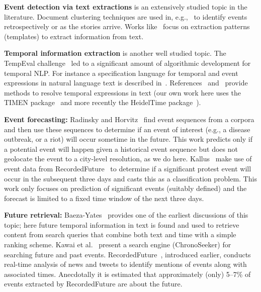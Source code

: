 \documentclass[letterpaper]{article}
\begin{document}
{\bf Event detection via text extractions}
is an extensively studied topic in the literature. Document clustering techniques are used 
in, e.g.,~\cite{Gabrilovich:2004:NPP} to identify events retrospectively or as the stories arrive.
Works like~\cite{Banko07openinformation,Chambers:2011:TIE,riloff2003learning} focus on
extraction patterns (templates) to extract information from text. 

{\bf Temporal information extraction} is another well studied topic.
The TempEval challenge~\cite{tempeval} led to a significant amount of
algorithmic development for temporal NLP.
For instance a specification language
for temporal and event expressions in natural language text is described in~\cite{timeml}.
References~\cite{LlorensDGS12} and~\cite{tempex} provide methods to
resolve temporal expressions in text (our own work here uses the TIMEN
package~\cite{LlorensDGS12} and more recently the HeidelTime
package~\cite{strotgen2014time}).

{\bf Event forecasting:} 
Radinsky and Horvitz~ find event sequences
from a corpora and then use these sequences to determine if an event of
interest (e.g., a disease outbreak, or a riot) will occur sometime in
the future. This work predicts only if a potential event will happen
given a historical event sequence but does not geolocate the event to a
city-level resolution, as we do here.  Kallus~
make use of event data from RecordedFuture~\cite{recordedFuture} to
determine if a  significant protest event will occur in the subsequent
three days and casts this as a classification problem.  This work only
focuses on prediction of significant events (suitably defined) and the
forecast is limited to a fixed time window of the next three days. 

{\bf Future retrieval:}
Baeza-Yates~ provides one of the earliest
discussions of this topic; here future temporal information in text is
found and used to retrieve content from search queries that combine both
text and time with a simple ranking scheme.  Kawai et
al.~ present a search engine (ChronoSeeker)
for searching future and past events.
RecordedFuture~\cite{recordedFuture}, introduced earlier, conducts
real-time analysis of news and tweets to identify mentions of events
along with associated times. Anecdotally it is estimated that
approximately (only) 5--7\% of events extracted by RecordedFuture are
about the future.
\end{document}
